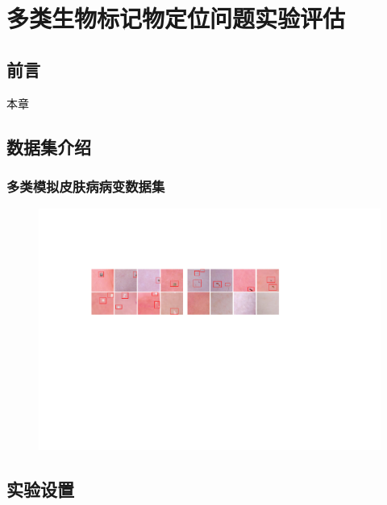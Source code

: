 \chapter{多类生物标记物定位问题实验评估}\label{sec:multi_classes}
\section{前言}
本章
\section{数据集介绍}
\subsection{多类模拟皮肤病病变数据集}
\begin{figure}[h]
	\centering
	\includegraphics[width=1.0\textwidth]{figure/multi_classes_simulated_skin.pdf}
	\caption{}
	\label{fig:mul_classes_simulated_ds}
\end{figure}

\section{实验设置}
